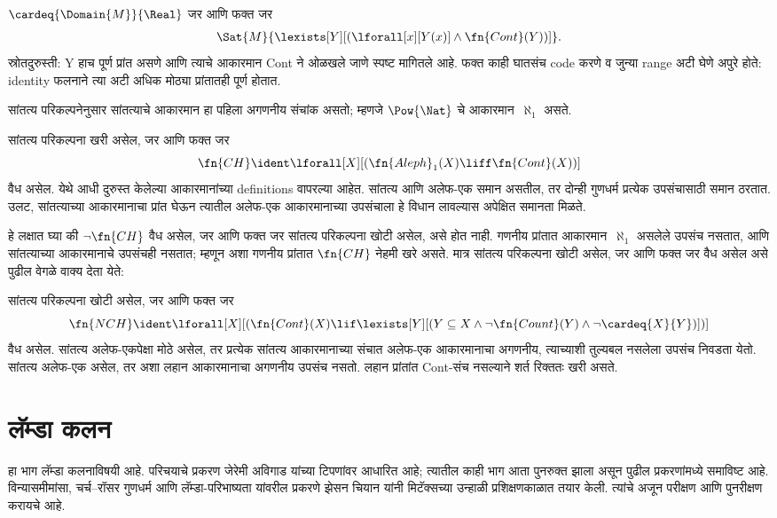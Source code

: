 \begin{prop}
$\cardeq{\Domain{M}}{\Real}$ जर आणि फक्त जर
\begin{multline*}
  \Sat{M}{\lexists[Y][(\lforall[x][Y(x)] \land \fn{Cont}(Y))]}.
        \end{multline*}
  स्रोतदुरुस्ती: Y हाच पूर्ण प्रांत असणे आणि त्याचे
  आकारमान Cont ने ओळखले जाणे स्पष्ट मागितले आहे. फक्त
  काही घातसंच code करणे व जुन्या range अटी घेणे अपुरे होते:
  identity फलनाने त्या अटी अधिक मोठ्या प्रांतातही पूर्ण होतात.
  \end{prop}

\begin{explain}
सांतत्य परिकल्पनेनुसार सांतत्याचे आकारमान
हा पहिला अगणनीय संचांक असतो;
म्हणजे $\Pow{\Nat}$ चे आकारमान~$\aleph_1$ असते.
\end{explain}

\begin{prop}
सांतत्य परिकल्पना खरी असेल, जर आणि फक्त जर
\[\fn{CH} \ident
\lforall[X][(\fn{Aleph}_1(X) \liff \fn{Cont}(X))]\]
वैध असेल. येथे आधी दुरुस्त केलेल्या आकारमानांच्या
definitions वापरल्या आहेत. सांतत्य आणि अलेफ-एक समान असतील,
तर दोन्ही गुणधर्म प्रत्येक उपसंचासाठी समान ठरतात. उलट,
सांतत्याच्या आकारमानाचा प्रांत घेऊन त्यातील अलेफ-एक
आकारमानाच्या उपसंचाला हे विधान लावल्यास अपेक्षित समानता मिळते.
\end{prop}

हे लक्षात घ्या की $\lnot \fn{CH}$ वैध असेल,
जर आणि फक्त जर सांतत्य परिकल्पना खोटी असेल,
असे होत नाही. गणनीय प्रांतात
आकारमान~$\aleph_1$ असलेले उपसंच नसतात,
आणि सांतत्याच्या आकारमानाचे उपसंचही नसतात;
म्हणून अशा गणनीय प्रांतात
$\fn{CH}$ नेहमी खरे असते. मात्र सांतत्य
परिकल्पना खोटी असेल, जर आणि फक्त जर
वैध असेल असे पुढील वेगळे वाक्य देता येते:

\begin{prop}
सांतत्य परिकल्पना खोटी असेल, जर आणि
फक्त जर \[\fn{NCH} \ident
\lforall[X][(\fn{Cont}(X) \lif \lexists[Y][(Y \subseteq X \land \lnot
    \fn{Count}(Y) \land \lnot \cardeq{X}{Y})])]\]
वैध असेल. सांतत्य अलेफ-एकपेक्षा मोठे असेल, तर
प्रत्येक सांतत्य आकारमानाच्या संचात अलेफ-एक आकारमानाचा
अगणनीय, त्याच्याशी तुल्यबल नसलेला उपसंच निवडता येतो.
सांतत्य अलेफ-एक असेल, तर अशा लहान आकारमानाचा अगणनीय
उपसंच नसतो. लहान प्रांतांत Cont-संच नसल्याने शर्त रिक्ततः खरी असते.
\end{prop}



\part{लॅम्डा कलन}\label{lam:part}
\begin{editorial}
हा भाग लॅम्डा कलनाविषयी आहे. परिचयाचे प्रकरण जेरेमी अविगाड यांच्या
टिपणांवर आधारित आहे; त्यातील काही भाग आता पुनरुक्त झाला असून पुढील
प्रकरणांमध्ये समाविष्ट आहे. विन्यासमीमांसा, चर्च--रॉसर गुणधर्म आणि
लॅम्डा-परिभाष्यता यांवरील प्रकरणे झेसन चियान यांनी मिटॅक्सच्या उन्हाळी
प्रशिक्षणकाळात तयार केली. त्यांचे अजून परीक्षण आणि पुनरीक्षण करायचे आहे.
\end{editorial}
